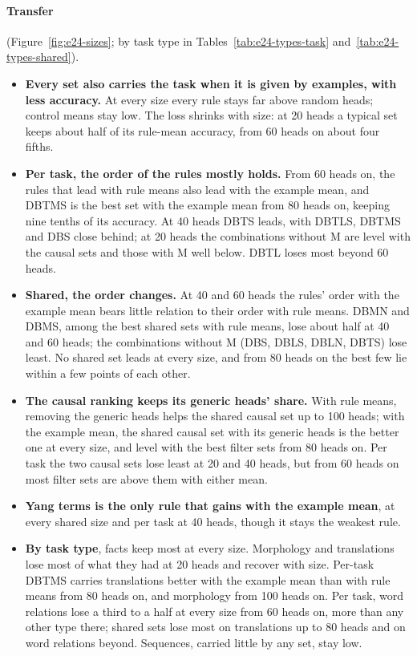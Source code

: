 \documentclass[10pt,a4paper]{article}
\begin{document}
\paragraph{Transfer} (Figure~\ref{fig:e24-sizes}; by task type in Tables~\ref{tab:e24-types-task} and~\ref{tab:e24-types-shared}).
\begin{itemize}
\item \textbf{Every set also carries the task when it is given by examples, with less accuracy.} At every size every rule stays far above random heads; control means stay low. The loss shrinks with size: at 20 heads a typical set keeps about half of its rule-mean accuracy, from 60 heads on about four fifths.
\item \textbf{Per task, the order of the rules mostly holds.} From 60 heads on, the rules that lead with rule means also lead with the example mean, and DBTMS is the best set with the example mean from 80 heads on, keeping nine tenths of its accuracy. At 40 heads DBTS leads, with DBTLS, DBTMS and DBS close behind; at 20 heads the combinations without M are level with the causal sets and those with M well below. DBTL loses most beyond 60 heads.
\item \textbf{Shared, the order changes.} At 40 and 60 heads the rules' order with the example mean bears little relation to their order with rule means. DBMN and DBMS, among the best shared sets with rule means, lose about half at 40 and 60 heads; the combinations without M (DBS, DBLS, DBLN, DBTS) lose least. No shared set leads at every size, and from 80 heads on the best few lie within a few points of each other.
\item \textbf{The causal ranking keeps its generic heads' share.} With rule means, removing the generic heads helps the shared causal set up to 100 heads; with the example mean, the shared causal set with its generic heads is the better one at every size, and level with the best filter sets from 80 heads on. Per task the two causal sets lose least at 20 and 40 heads, but from 60 heads on most filter sets are above them with either mean.
\item \textbf{Yang terms is the only rule that gains with the example mean}, at every shared size and per task at 40 heads, though it stays the weakest rule.
\item \textbf{By task type}, facts keep most at every size. Morphology and translations lose most of what they had at 20 heads and recover with size. Per-task DBTMS carries translations better with the example mean than with rule means from 80 heads on, and morphology from 100 heads on. Per task, word relations lose a third to a half at every size from 60 heads on, more than any other type there; shared sets lose most on translations up to 80 heads and on word relations beyond. Sequences, carried little by any set, stay low.
\end{itemize}
\end{document}
